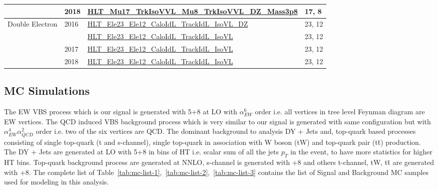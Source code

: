 \begin{table}[!ht]
{\begin{tabular}{clll}
      \cmidrule(lr){2-4}
              & \multirow{1}{*}{2018} & \url{HLT_Mu17_TrkIsoVVL_Mu8_TrkIsoVVL_DZ_Mass3p8} & 17, 8  \GeV{}       \\
      \midrule
      \multirow{4}{*}{Double Electron}
              & \multirow{2}{*}{2016} & \url{HLT_Ele23_Ele12_CaloIdL_TrackIdL_IsoVL_DZ}   & 23, 12 \GeV{}       \\
              &                       & \url{HLT_Ele23_Ele12_CaloIdL_TrackIdL_IsoVL}      & 23, 12 \GeV{}       \\
      \cmidrule(lr){2-4}
              & \multirow{1}{*}{2017} & \url{HLT_Ele23_Ele12_CaloIdL_TrackIdL_IsoVL}      & 23, 12 \GeV{}       \\
      \cmidrule(lr){2-4}
              & \multirow{1}{*}{2018} & \url{HLT_Ele23_Ele12_CaloIdL_TrackIdL_IsoVL}      & 23, 12 \GeV{}       \\
      \bottomrule
    \end{tabular}}\label{tab:hlt-paths}
\end{table}

\subsection{
  MC Simulations
}

The \gls{EW} \gls{VBS} process which is our signal is
generated with \MADGRAPH{}5+\PYTHIA{}8 at \gls{LO} with \( \alpha_{EW}^{6} \) order
i.e.
all vertices in tree level Feynman diagram are \gls{EW} vertices.
The \gls{QCD} induced \gls{VBS} background process which is very
similar to our signal is generated with same configuration
but with \( \alpha_{EW}^{4} \alpha_{QCD}^{2} \) order i.e.
two of the six vertices are \gls{QCD}. The dominant background to analysis
\gls{DY} + Jets and, top-quark based processes consisting of
single top-quark (t and s-channel),
single top-quark in association with W boson (tW) and top-quark pair (t\=t) production.
The \gls{DY} + Jets are generated at \gls{LO} with \MADGRAPH{}5+\PYTHIA{}8
in bins of HT i.e.
scalar sum of all the jets \( p_{T} \) in the event, to have more statistics
for higher HT bins. Top-quark background process are generated at \gls{NNLO},
s-channel is generated with \MGvATNLO+\PYTHIA{}8 and others
t-channel, tW, t\=t are generated with \POWHEG{}+\PYTHIA{}8.
The complete list of Table~\ref{tab:mc-list-1},~\ref{tab:mc-list-2},~\ref{tab:mc-list-3} contains
the list of Signal and Background MC samples used for modeling in this analysis.

